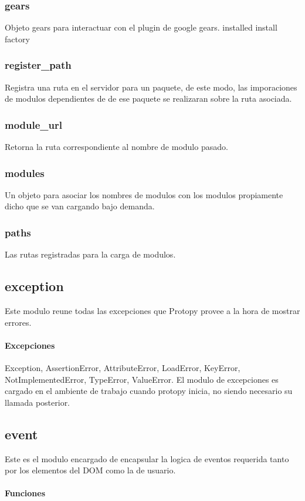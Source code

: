 \subsubsection*{gears}
Objeto gears para interactuar con el plugin de google gears.
installed
install
factory
\subsubsection*{register\_path}
Registra una ruta en el servidor para un paquete, de este modo, las imporaciones
de modulos dependientes de de ese paquete se realizaran sobre la ruta asociada. 
\subsubsection*{module\_url}
Retorna la ruta correspondiente al nombre de modulo pasado.
\subsubsection*{modules}
Un objeto para asociar los nombres de modulos con los modulos propiamente dicho
que se van cargando bajo demanda.
\subsubsection*{paths}
Las rutas registradas para la carga de modulos.

\subsection{exception}
Este modulo reune todas las excepciones que Protopy provee a la hora de mostrar
errores.
\paragraph{Excepciones}
Exception, AssertionError, AttributeError, LoadError, KeyError,
NotImplementedError, TypeError, ValueError.
El modulo de excepciones es cargado en el ambiente de trabajo cuando protopy
inicia, no siendo necesario su llamada posterior.

\subsection{event}
Este es el modulo encargado de encapsular la logica de eventos requerida tanto
por los elementos del DOM como la de usuario.

\paragraph{Funciones}
